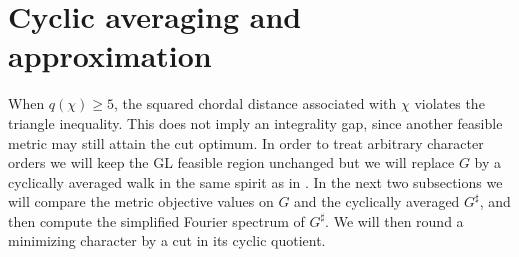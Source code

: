 \documentclass[11pt]{article}
\theoremstyle{definition}
\theoremstyle{remark}
\begin{document}



\section{Cyclic averaging and approximation}\label{sec:averaging}
When $q(\chi)\geq 5$, the squared chordal distance associated with $\chi$ violates the triangle inequality. This does not imply an integrality gap, since another feasible metric may still attain the cut optimum. In order to treat arbitrary character orders we will keep the GL feasible region unchanged but we will replace $G$ by a cyclically averaged walk in the same spirit as in \cite{dorsiaetall25}. In the next two subsections we will compare the metric objective values on $G$ and the cyclically averaged $G^\sharp$, and then compute the simplified Fourier spectrum of $G^\sharp$. We will then round a minimizing character by a cut in its cyclic quotient.
\end{document}
